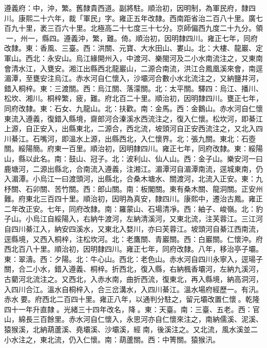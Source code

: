 \begin{pinyinscope}
遵義府：中，沖，繁。舊隸貴西道。副將駐。順治初，因明制，為軍民府，隸四川。康熙二十六年，裁「軍民」字。雍正五年改隸。西南距省治二百八十里。廣七百九十里，袤三百六十里。北極高二十七度三十七分。京師偏西九度二十九分。領一，州一，縣四。遵義沖，繁，難。倚。順治初，因明隸四川。雍正七年，同府改隸。東：香風、三臺。西：洪關、元寶、大水田山、婁山。北：大樓、龍巖、定軍山。西北：永安山。烏江緣開州入，中渡河、樂閩河及二小水南流注之，又東南會清水江，入甕安。湘江出縣西北龍巖山，二源合南流，洪江合鳳凰溪來會，南逕湄潭，至甕安注烏江。赤水河自仁懷入，沙壩河合數小水北流注之，又納鹽井河，錯入桐梓。東：三渡關。西：烏江關、落濛關。北：太平關。驛四：烏江、播川、松坎、湘川。桐梓繁，疲，難。府北百二十里。順治初，因明隸四川。甕正七年，同府改隸。東：石女、九龍山。北：扶歡。南：金馬。西：金鵝山。赤水河自仁懷東流入遵義，復錯入縣境，齋郎河合溱溪水西流注之，復入仁懷。松坎河，即綦江上源，自正安入，出縣東北，二源合，西北流，坡頭河自正安西流注之，又北入四川綦江。石嘴河，即溫水上源，出縣西北，入仁懷界。北：張九關。東北：石壺關。綏陽簡。府東一百里。順治初，因明隸四川。雍正七年，同府改隸。東：綏陽山，縣以此名。南：鼓山、冠子。北：波利山、仙人山。西：金子山。樂安河一曰鹿塘河，二源出縣北，合南流入遵義，注湘江。湄潭河自湄潭南流，逕城東南，仍入湄潭。小烏江一曰渡頭河，出縣北，合桑木塘水、關渡河，北流入正安。東：九杼關、石卯關、苦竹關。西：郎山關。南：板閣關。東有桑木關、龍洞關。正安州難。府東北三百四十里。順治初，因明為真安，隸四川。康熙中，遷治古鳳。雍正二年改正安。七年，同府改隸。南：羅蒙山、石場清凈。西：紬子、峻嶺。北：豹子山。小烏江自綏陽入，右納牛渡河，左納清溪河，又東北流，注芙蓉江。三江河自四川綦江入，納安四溪水，又東北入婺川，亦曰芙蓉江。坡頭河自綦江西南流，逕縣境，又西入桐梓，注松坎河。北：老鷹關、青巖關。西：白巖關。仁懷沖。府西北百八十里。順治初，因明隸四川。雍正七年，同府改隸。八年，移治亭子壩。東：翠濤。西：夕陽。北：牛心山。西北：老色山。赤水河自四川永寧入，逕瑒子關，合二小水，錯入遵義、桐梓。折西北，復入縣，右納楓香壩河，左納九溪河，古藺河北流注之。又西北，入赤水南，曲折西流，復東北，再入縣境，納高洞河，入四川合江。溫水自桐梓入，合三岔溝水，入四川綦江。溫水場府經歷一。有汛。赤水要。府西北二百四十里。雍正八年，以通判分駐之，留元壩改置仁懷。乾隆四十一年升直隸。光緒三十四年改名，降。東：天臺。南：三臺、五老。西：官山，綿長三百餘里。赤水河自仁懷入，永思河亦自仁懷來注之，南納儒溪、泥溪、猿猴溪，北納葫蘆溪、堯壩溪、沙壩溪，經南，後溪注之。又北流，風水溪並二小水注之，東北流，仍入仁懷。南：葫蘆關。西：中箐關。猿猴汛。


\end{pinyinscope}

